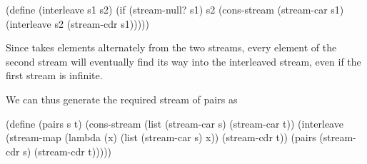 \begin{codeBlock}
(define (interleave s1 s2)
  (if (stream-null? s1)
      s2
      (cons-stream (stream-car s1)
                   (interleave s2 (stream-cdr s1)))))
\end{codeBlock}

\noindent
Since  takes elements alternately from the two streams, every
element of the second stream will eventually find its way into the interleaved
stream, even if the first stream is infinite.

We can thus generate the required stream of pairs as

\begin{codeBlock}
(define (pairs s t)
  (cons-stream
   (list (stream-car s) (stream-car t))
   (interleave
    (stream-map (lambda (x) (list (stream-car s) x))
                (stream-cdr t))
    (pairs (stream-cdr s) (stream-cdr t)))))
\end{codeBlock}

